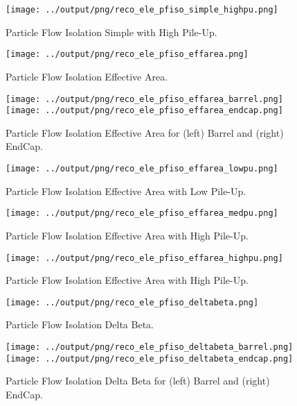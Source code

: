 \documentclass[11pt]{book}
\begin{document}
\begin{figure}[ht]
\centering
\texttt{[image: ../output/png/reco\_ele\_pfiso\_simple\_highpu.png]}
\caption{Particle Flow Isolation Simple with High Pile-Up.}
\label{fig:reco_ele_pfiso_simple_highpu}
\end{figure}

\begin{figure}[ht]
\centering
\texttt{[image: ../output/png/reco\_ele\_pfiso\_effarea.png]}
\caption{Particle Flow Isolation Effective Area.}
\label{fig:reco_ele_pfiso_effarea}
\end{figure}

\begin{figure}[ht]
\centering
\texttt{[image: ../output/png/reco\_ele\_pfiso\_effarea\_barrel.png]}
\texttt{[image: ../output/png/reco\_ele\_pfiso\_effarea\_endcap.png]}
\caption{Particle Flow Isolation Effective Area for (left) Barrel and (right) EndCap.}
\label{fig:reco_ele_pfiso_effarea_regions}
\end{figure}

\begin{figure}[ht]
\centering
\texttt{[image: ../output/png/reco\_ele\_pfiso\_effarea\_lowpu.png]}
\caption{Particle Flow Isolation Effective Area with Low Pile-Up.}
\label{fig:reco_ele_pfiso_effarea_lowpu}
\end{figure}

\begin{figure}[ht]
\centering
\texttt{[image: ../output/png/reco\_ele\_pfiso\_effarea\_medpu.png]}
\caption{Particle Flow Isolation Effective Area with High Pile-Up.}
\label{fig:reco_ele_pfiso_effarea_medpu}
\end{figure}

\begin{figure}[ht]
\centering
\texttt{[image: ../output/png/reco\_ele\_pfiso\_effarea\_highpu.png]}
\caption{Particle Flow Isolation Effective Area with High Pile-Up.}
\label{fig:reco_ele_pfiso_effarea_highpu}
\end{figure}

\begin{figure}[ht]
\centering
\texttt{[image: ../output/png/reco\_ele\_pfiso\_deltabeta.png]}
\caption{Particle Flow Isolation Delta Beta.}
\label{fig:reco_ele_pfiso_deltabeta}
\end{figure}

\begin{figure}[ht]
\centering
\texttt{[image: ../output/png/reco\_ele\_pfiso\_deltabeta\_barrel.png]}
\texttt{[image: ../output/png/reco\_ele\_pfiso\_deltabeta\_endcap.png]}
\caption{Particle Flow Isolation Delta Beta for (left) Barrel and (right) EndCap.}
\label{fig:reco_ele_pfiso_deltabeta_regions}
\end{figure}
\end{document}
